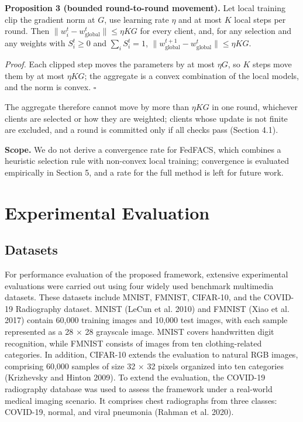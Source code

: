 \documentclass[pdflatex,sn-mathphys-num,oneside]{sn-jnl}%
\theoremstyle{thmstyleone}%
\theoremstyle{thmstyletwo}%
\theoremstyle{thmstylethree}%
\begin{document}
\textbf{Proposition 3 (bounded round-to-round movement).} Let local training clip the gradient norm at $G$, use learning rate $\eta$ and at most $K$ local steps per round. Then $\|w_i^t-w_{\text{global}}^t\|\le\eta KG$ for every client, and, for any selection and any weights with $S_i^t\ge 0$ and $\sum_i S_i^t=1$, $\|w_{\text{global}}^{t+1}-w_{\text{global}}^t\|\le\eta KG$.

\textit{Proof.} Each clipped step moves the parameters by at most $\eta G$, so $K$ steps move them by at most $\eta KG$; the aggregate is a convex combination of the local models, and the norm is convex. \hfill$\square$

The aggregate therefore cannot move by more than $\eta KG$ in one round, whichever clients are selected or how they are weighted; clients whose update is not finite are excluded, and a round is committed only if all checks pass (Section 4.1).

\textbf{Scope.} We do not derive a convergence rate for FedFACS, which combines a heuristic selection rule with non-convex local training; convergence is evaluated empirically in Section 5, and a rate for the full method is left for future work.

\section{Experimental Evaluation}\label{sec5}

\subsection{Datasets}

For performance evaluation of the proposed framework, extensive experimental evaluations were carried out using four widely used benchmark multimedia datasets. These datasets include MNIST, FMNIST, CIFAR-10, and the COVID-19 Radiography dataset. MNIST (LeCun et al. 2010) and FMNIST (Xiao et al. 2017) contain 60,000 training images and 10,000 test images, with each sample represented as a 28 \ensuremath{\times} 28 grayscale image. MNIST covers handwritten digit recognition, while FMNIST consists of images from ten clothing-related categories. In addition, CIFAR-10 extends the evaluation to natural RGB images, comprising 60,000 samples of size 32 \ensuremath{\times} 32 pixels organized into ten categories (Krizhevsky and Hinton 2009). To extend the evaluation, the COVID-19 radiography database was used to assess the framework under a real-world medical imaging scenario. It comprises chest radiographs from three classes: COVID-19, normal, and viral pneumonia (Rahman et al. 2020).  
\end{document}
